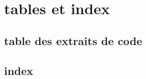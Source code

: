 \documentclass{scrartcl}%
\begin{document}
\section{tables et index}
\subsection{table des extraits de code}

\nowebchunks

\subsection{index}

\nowebindex
\end{document}
